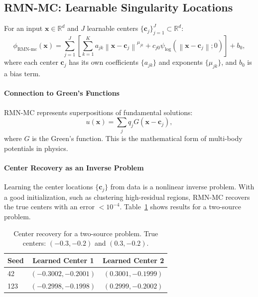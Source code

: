 \documentclass[twoside,11pt]{article}
\newcommand{\R}{\mathbb{R}}
\newcommand{\bx}{\bm{x}}
\newcommand{\bc}{\bm{c}}
\newcommand{\norm}[1]{\left\|#1\right\|}
\begin{document}
\subsection{RMN-MC: Learnable Singularity Locations}
\label{subsec:rmn_multicenter}

\begin{definition}[RMN-MC]
	For an input $\bx \in \R^d$ and $J$ learnable centers $\{\bc_j\}_{j=1}^J \subset \R^d$:
	\begin{equation}
		\phi_{\text{RMN-mc}}(\bx) = \sum_{j=1}^J \left[ \sum_{k=1}^{K} a_{jk} \norm{\bx - \bc_j}^{\mu_{jk}} + c_{j0} \psi_{\log}(\norm{\bx - \bc_j};0) \right] + b_0,
		\label{eq:rmn_multicenter}
	\end{equation}
	where each center $\bc_j$ has its own coefficients $\{a_{jk}\}$ and exponents $\{\mu_{jk}\}$, and $b_0$ is a bias term.
\end{definition}

\paragraph{Connection to Green's Functions} RMN-MC represents superpositions of fundamental solutions:
\begin{equation}
	u(\bx) = \sum_j q_j G(\bx - \bc_j),
\end{equation}
where $G$ is the Green's function. This is the mathematical form of multi-body potentials in physics.

\paragraph{Center Recovery as an Inverse Problem} Learning the center locations $\{\bc_j\}$ from data is a nonlinear inverse problem. With a good initialization, such as clustering high-residual regions, RMN-MC recovers the true centers with an error $< 10^{-4}$. Table~\ref{tab:center_recovery} shows results for a two-source problem.

\begin{table}[t]
	\centering
	\begin{tabular}{lcc}
		\toprule
		Seed & Learned Center 1     & Learned Center 2    \\
		\midrule
		42   & $(-0.3002, -0.2001)$ & $(0.3001, -0.1999)$ \\
		123  & $(-0.2998, -0.1998)$ & $(0.2999, -0.2002)$ \\
		\bottomrule
	\end{tabular}
	\caption{Center recovery for a two-source problem. True centers: $(-0.3, -0.2)$ and $(0.3, -0.2)$.}
	\label{tab:center_recovery}

\end{table}
\end{document}

